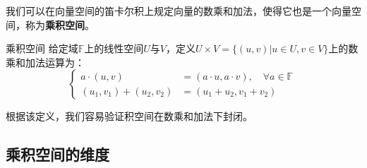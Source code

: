 
\begin{issues}
\issueTODO
\end{issues}


我们可以在向量空间的笛卡尔积上规定向量的数乘和加法，使得它也是一个向量空间，称为\textbf{乘积空间}。

\begin{definition}{乘积空间}
给定域$\mathbb F $上的线性空间$U$与$V$，定义$U\times V=\{(u, v)|u \in U, v \in V\}$上的数乘和加法运算为：
\begin{equation}
\left\{\begin{aligned}
a \cdot (u, v) &= (a \cdot u, a \cdot v), \quad \forall a \in \mathbb F\\
(u_1, v_1) + (u_2, v_2) &= (u_1 + u_2, v_1 + v_2)
\end{aligned}\right.~
\end{equation}
\end{definition}
根据该定义，我们容易验证积空间在数乘和加法下封闭。

% 




\subsection{乘积空间的维度}

